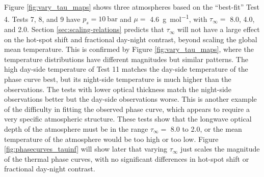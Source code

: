 Figure \ref{fig:vary_tau_maps} shows three atmospheres based on the ``best-fit'' Test 4. Tests 7, 8, and 9 have $p_{s} = 10\ \mathrm{bar}$ and $\mu =$ \SI{4.6}{\gram\per\mole}, with $\tau_{\infty} =$ 8.0, 4.0, and 2.0. Section \ref{sec:scaling-relations} predicts that $\tau_{\infty}$ will not have a large effect on the hot-spot shift and fractional day-night contrast, beyond scaling the global mean temperature. This is confirmed by Figure \ref{fig:vary_tau_maps}, where the temperature distributions have different magnitudes but similar patterns. The high day-side temperature of Test 11 matches the day-side temperature of the phase curve best, but its night-side temperature is much higher than the observations. The tests with lower optical thickness match the night-side observations better but the day-side observations worse. This is another example of the difficulty in fitting the observed phase curve, which appears to require a very specific atmospheric structure. These tests show that the longwave optical depth of the atmosphere must be in the range $\tau_{\infty} =$ 8.0 to 2.0, or the mean temperature of the atmosphere would be too high or too low. Figure \ref{fig:phasecurves_tauinf} will show later that varying $\tau_{\infty}$ just scales the magnitude of the thermal phase curves, with no significant differences in hot-spot shift or fractional day-night contrast.


